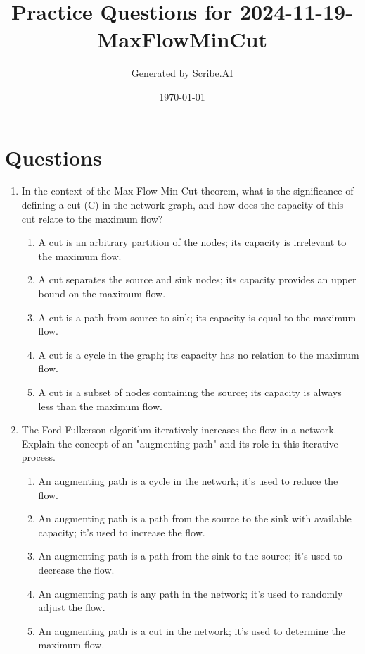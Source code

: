 \documentclass{article}%
\title{Practice Questions for 2024{-}11{-}19{-}MaxFlowMinCut}%
\author{Generated by Scribe.AI}%
\date{\today}%
\begin{document}
%
\normalsize%
\maketitle%
\section{Questions}%
\label{sec:Questions}%
\begin{enumerate}%
\item In the context of the Max Flow Min Cut theorem, what is the significance of defining a cut (C) in the network graph, and how does the capacity of this cut relate to the maximum flow?%
\begin{enumerate}%
\item A cut is an arbitrary partition of the nodes; its capacity is irrelevant to the maximum flow.%
\item A cut separates the source and sink nodes; its capacity provides an upper bound on the maximum flow.%
\item A cut is a path from source to sink; its capacity is equal to the maximum flow.%
\item A cut is a cycle in the graph; its capacity has no relation to the maximum flow.%
\item A cut is a subset of nodes containing the source; its capacity is always less than the maximum flow.%
\end{enumerate}%
\vspace{1em}%
\item The Ford-Fulkerson algorithm iteratively increases the flow in a network.  Explain the concept of an "augmenting path" and its role in this iterative process.%
\begin{enumerate}%
\item An augmenting path is a cycle in the network; it's used to reduce the flow.%
\item An augmenting path is a path from the source to the sink with available capacity; it's used to increase the flow.%
\item An augmenting path is a path from the sink to the source; it's used to decrease the flow.%
\item An augmenting path is any path in the network; it's used to randomly adjust the flow.%
\item An augmenting path is a cut in the network; it's used to determine the maximum flow.%
\end{enumerate}%
\vspace{1em}%

\end{enumerate}
\end{document}
